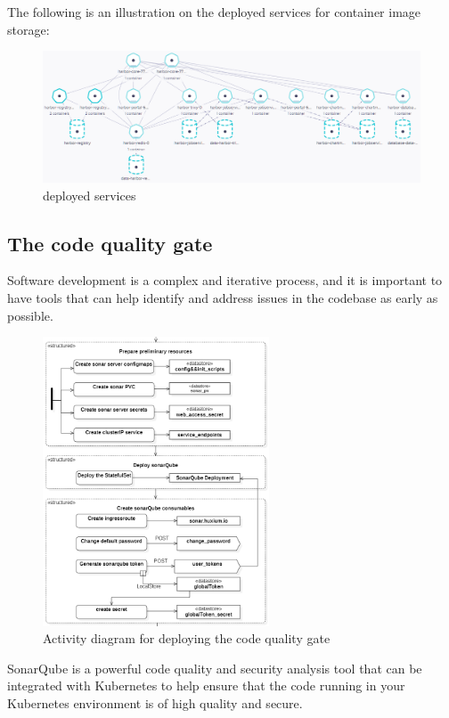 The following is an illustration on the deployed services for container image storage: 
\begin{figure}[H]\centering
\includegraphics[width=1.0\textwidth,angle=00]{assets/f40.png}
\caption{deployed services}
\label{fig:Deployed services}
\end{figure}

\subsection{The code quality gate}

Software development is a complex and iterative process, and it is important to have tools that can help identify and address issues in the codebase as early as possible. 

\begin{figure}[H]\centering
\includegraphics[width=0.6\textwidth,angle=00]{assets/f41.png}
\caption{Activity diagram for deploying the code quality gate}
\label{fig:Activity diagram for deploying the code quality gate}
\end{figure}

SonarQube is a powerful code quality and security analysis tool that can be integrated with Kubernetes to help ensure that the code running in your Kubernetes environment is of high quality and secure.

